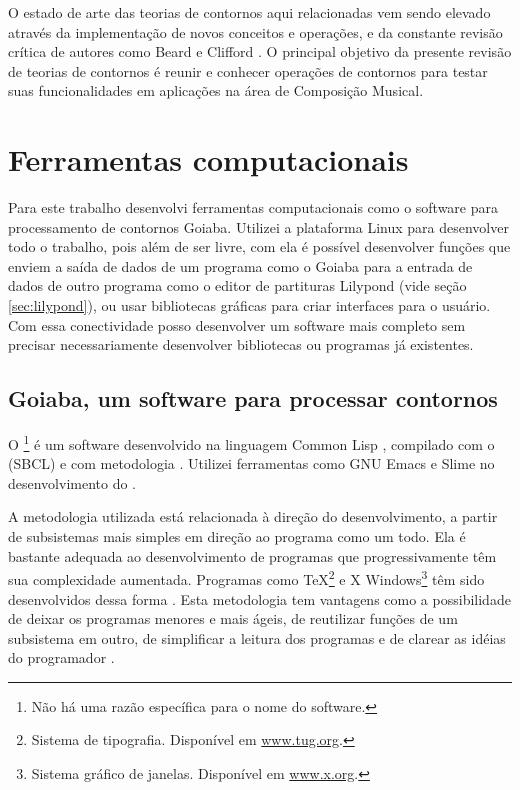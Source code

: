 O estado de arte das teorias de contornos aqui relacionadas vem sendo
elevado através da implementação de novos conceitos e operações, e da
constante revisão crítica de autores como Beard e Clifford
\cite{beard03:contour,clifford95:contour}. O principal objetivo da
presente revisão de teorias de contornos é reunir e conhecer operações
de contornos para testar suas funcionalidades em aplicações na área de
Composição Musical.

\chapter{Ferramentas computacionais}
\label{cha:ferramentas}

Para este trabalho desenvolvi ferramentas computacionais como o
software para processamento de contornos Goiaba. Utilizei a plataforma
Linux para desenvolver todo o trabalho, pois além de ser livre, com
ela é possível desenvolver funções que enviem a saída de dados de um
programa como o Goiaba para a entrada de dados de outro programa como
o editor de partituras Lilypond (vide seção \ref{sec:lilypond}), ou
usar bibliotecas gráficas para criar interfaces para o usuário. Com
essa conectividade posso desenvolver um software mais completo sem
precisar necessariamente desenvolver bibliotecas ou programas já
existentes.

\section{Goiaba, um software para processar contornos}
\label{sec:goiaba-software-para}

O \goiaba{}\footnote{Não há uma razão específica para o nome do
  software.}  é um software desenvolvido na linguagem Common Lisp
\cite{graham94:lisp,seibel05:practical,shapiro92:common}, compilado
com o  (SBCL) \cite{team07:sbcl} e com
metodologia . Utilizei ferramentas como GNU Emacs
\cite{stallman07:gnu} e Slime \cite{team05:slime} no desenvolvimento
do \goiaba{}.

A metodologia  utilizada está relacionada à direção do
desenvolvimento, a partir de subsistemas mais simples em direção ao
programa como um todo. Ela é bastante adequada ao desenvolvimento de
programas que progressivamente têm sua complexidade
aumentada. Programas como \TeX{}\footnote{Sistema de
  tipografia. Disponível em \url{www.tug.org}.} e X
Windows\footnote{Sistema gráfico de janelas. Disponível em
  \url{www.x.org}.} têm sido desenvolvidos dessa forma
\cite[p. vi]{graham94:lisp}. Esta metodologia tem vantagens como a
possibilidade de deixar os programas menores e mais ágeis, de
reutilizar funções de um subsistema em outro, de simplificar a leitura
dos programas e de clarear as idéias do programador
\cite[p. 4]{graham94:lisp}.

